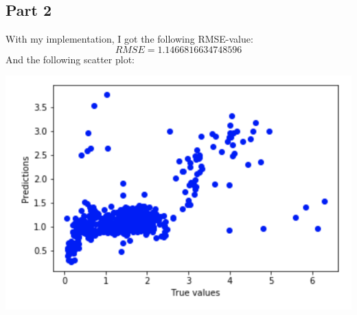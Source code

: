 \documentclass{report}
\begin{document}
\subsection*{Part 2}
With my implementation, I got the following RMSE-value:
$$RMSE = 1.1466816634748596$$
And the following scatter plot:
\begin{center}
    \includegraphics[height = 7 cm]{LinRegNeighbors_scatter.png}
\end{center}
\end{document}
